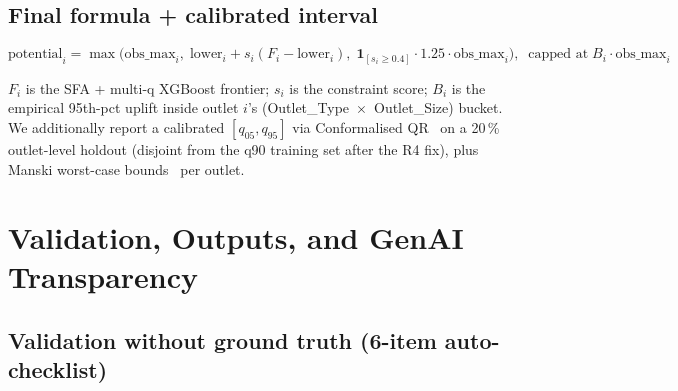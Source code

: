 \documentclass[10pt,a4paper]{article}
\begin{document}
\subsection{Final formula + calibrated interval}

\vspace{-0.4em}
\[
\text{potential}_i = \max\!\bigl(\text{obs\_max}_i,\; \text{lower}_i + s_i (F_i - \text{lower}_i),\; \mathbf{1}_{[s_i \geq 0.4]} \cdot 1.25 \cdot \text{obs\_max}_i\bigr),\;\; \text{capped at}\; B_i \cdot \text{obs\_max}_i
\]
\vspace{-0.4em}

$F_i$ is the SFA + multi-q XGBoost frontier; $s_i$ is the constraint score;
$B_i$ is the empirical 95th-pct uplift inside outlet $i$'s
(Outlet\_Type~$\times$~Outlet\_Size) bucket. We additionally report a
calibrated $[q_{05}, q_{95}]$ via Conformalised QR~\cite{romano2019cqr} on a
20\,\% outlet-level holdout (disjoint from the q90 training set after the R4
fix), plus Manski worst-case bounds~\cite{manski2003partial} per outlet.

\newpage
\section{Validation, Outputs, and GenAI Transparency}

\subsection{Validation without ground truth (6-item auto-checklist)}
\end{document}

